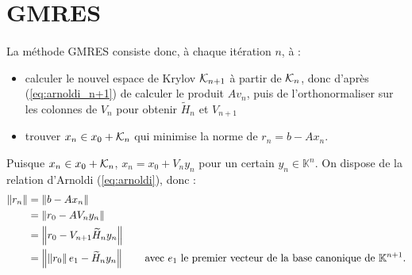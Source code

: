 \section{GMRES}

	\paragraph{}
	La méthode GMRES consiste donc, à chaque itération $n$, à :
	\begin{itemize}
		\item calculer le nouvel espace de Krylov $\krylov{n+1}$ à partir de $\krylov{n}$, donc d'après (\ref{eq:arnoldi_n+1}) de calculer le produit $Av_n$, puis de l'orthonormaliser sur les colonnes de $V_n$ pour obtenir $\widetilde{H}_n$ et $V_{n+1}$
		\item trouver $x_n \in x_0 + \krylov{n}$ qui minimise la norme de $r_n = b - Ax_n$.
	\end{itemize}
	Puisque $x_n \in x_0 + \krylov{n}$, $x_n = x_0 + V_n y_n$ pour un certain $y_n\in\mathbb{K}^n$.
	On dispose de la relation d'Arnoldi (\ref{eq:arnoldi}), donc :
	\begin{align*}
		\norm{r_n} &= \norm{b - Ax_n} \\
		&= \norm{r_0 - AV_ny_n} \\
		&= \norm{r_0 - V_{n+1}\widetilde{H}_ny_n} \\
		&= \norm{\norm{r_0} e_1 - \widetilde{H}_ny_n}\qquad\textrm{avec $e_1$ le premier vecteur de la base canonique de $\mathbb{K}^{n+1}$.}
	\end{align*}

